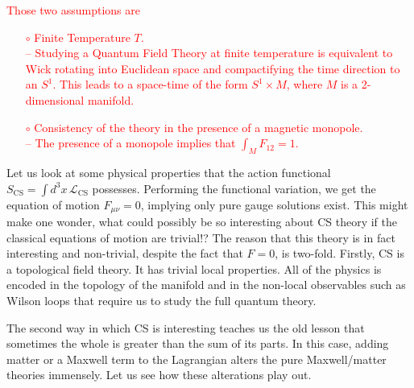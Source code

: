 \textcolor{red}{Those two assumptions are}
\textcolor{red}{
    \begin{itemize}
        \item[$\circ$] Finite Temperature $T$.\\
            -- Studying a Quantum Field Theory at finite temperature is equivalent to Wick rotating into Euclidean space and compactifying the time direction to an $S^1$. This leads to a space-time of the form $S^1 \times M$, where $M$ is a 2-dimensional manifold.
        \item[$\circ$] Consistency of the theory in the presence of a magnetic monopole.\\
            -- The presence of a monopole implies that $ \int_{M} F_{12} = 1$.
    \end{itemize}}



    Let us look at some physical properties that the action functional $S_{\text{CS}} = \int d^3x \, \mathcal{L}_{\text{CS}}$ possesses. Performing the functional variation, we get the equation of motion $F_{\mu \nu}=0$, implying only pure gauge solutions exist. This might make one wonder, what could possibly be so interesting about CS theory if the classical equations of motion are trivial!?
    The reason that this theory is in fact interesting and non-trivial, despite the fact that $F=0$, is two-fold. Firstly, CS is a topological field theory. It has trivial local properties. All of the physics is encoded in the topology of the manifold and in the non-local observables such as Wilson loops that require us to study the full quantum theory.

    The second way in which CS is interesting teaches us the old lesson that sometimes the whole is greater than the sum of its parts. In this case, adding matter or a Maxwell term to the Lagrangian alters the pure Maxwell/matter theories immensely. Let us see how these alterations play out.

